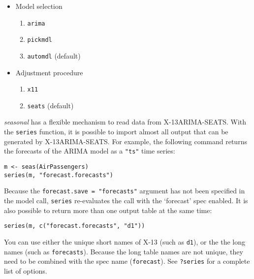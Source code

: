 \begin{itemize}
\itemsep1pt\parskip0pt
\item
  Model selection

  \begin{enumerate}
  \def\labelenumi{\arabic{enumi}.}
  \itemsep1pt\parskip0pt
  \item
    \texttt{arima}
  \item
    \texttt{pickmdl}
  \item
    \texttt{automdl} (default)
  \end{enumerate}
\item
  Adjustment procedure

  \begin{enumerate}
  \def\labelenumi{\arabic{enumi}.}
  \itemsep1pt\parskip0pt
  \item
    \texttt{x11}
  \item
    \texttt{seats} (default)
  \end{enumerate}
\end{itemize}


\emph{seasonal} has a flexible mechanism to read data from
X-13ARIMA-SEATS. With the \texttt{series} function, it is possible to
import almost all output that can be generated by X-13ARIMA-SEATS. For
example, the following command returns the forecasts of the ARIMA model
as a \texttt{"ts"} time series:

\begin{verbatim}
m <- seas(AirPassengers)
series(m, "forecast.forecasts")
\end{verbatim}

Because the \texttt{forecast.save = "forecasts"} argument has not been
specified in the model call, \texttt{series} re-evaluates the call with
the `forecast' spec enabled. It is also possible to return more than one
output table at the same time:

\begin{verbatim}
series(m, c("forecast.forecasts", "d1"))
\end{verbatim}

You can use either the unique short names of X-13 (such as \texttt{d1}),
or the the long names (such as \texttt{forecasts}). Because the long
table names are not unique, they need to be combined with the spec name
(\texttt{forecast}). See \texttt{?series} for a complete list of
options.

